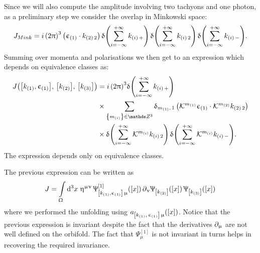 Since we will also compute the amplitude involving two tachyons and one photon, as a preliminary step we consider the overlap in Minkowski space:
\begin{equation}
  J_{Mink}
  =
  i\,
  \qty(2\uppi)^3\,
  \qty(\upepsilon_{\qty(1)} \cdot k_{\qty(2)\, 2})\,
  \updelta\qty( \sum\limits_{i = -\infty}^{+\infty} k_{\qty(i)\, +} )\,
  \updelta\qty( \sum\limits_{i = -\infty}^{+\infty} k_{\qty(i)\, 2} )\,
  \updelta\qty( \sum\limits_{i = -\infty}^{+\infty} k_{\qty(i)\, -} ).
\end{equation}
Summing over momenta and polarisations we then get to an expression which depends on equivalence classes as:
\begin{equation}
  \begin{split}
    J\qty(%
      \qty[k_{\qty(1)}, \epsilon_{\qty(1)}],\,
      \qty[k_{\qty(2)}],\,
      \qty[k_{\qty(3)}]
    )
    & =
    i\, \qty(2\pi)^3 \delta\qty( \infinfsum{i} k_{\qty(i)\, +} )\,
    \\
    & \times
    \sum_{\qty{ m_{(i)} } \in \Z^3}
    \delta_{m_{\qty(1)},\, 1}\,
    \qty(%
      \cK^{m_{\qty(1)}} \epsilon_{\qty(1)}
      \cdot
      \cK^{m_{\qty(2)}} k_{\qty(2)\, 2}
    )
    \\
    & \times
    \delta\qty( \infinfsum{i} \cK^{m_{(i)} } k_{\qty(i)\, 2} )\,
    \delta\qty( \infinfsum{i} \cK^{m_{(i)} } k_{\qty(i)\, -} ).
  \end{split}
  \label{eq:Spin_001_overlap_from_covering}
\end{equation}
The expression depends only on equivalence classes.\footnotemark{}

The previous expression can be written as
\begin{equation}
  J
  =
  \int\limits_{\Upomega} \dd[3]{x}\,
  \upeta^{\upmu\upnu}\,
  \Uppsi^{[1]}_{\qty[k_{\qty(1)}, \upepsilon_{\qty(1)}]\, \upmu}\qty(\qty[x])\,
  \partial_{\upnu} \Uppsi_{ \qty[k_{\qty(2)}] }\qty(\qty[x])\,
  \Uppsi_{ \qty[k_{\qty(3)}] }\qty(\qty[x])
\end{equation}
where we performed the unfolding using $a_{\qty[k_{\qty(1)},\, \upepsilon_{\qty(1)}]\, \upmu}\qty(\qty[x])$.\footnotemark{}
Notice that the previous expression is invariant despite the fact that the derivatives $\partial_{\upmu}$ are not well defined on the orbifold.
The fact that $\Psi^{[1]}_{\mu}$ is not invariant in turns helps in recovering the required invariance.

